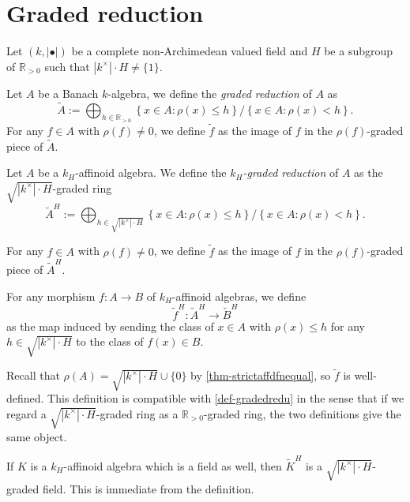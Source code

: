 \section{Graded reduction}
Let $(k,|\bullet|)$ be a complete non-Archimedean valued field and $H$ be a subgroup of $\mathbb{R}_{>0}$ such that $|k^{\times}|\cdot H\neq \{1\}$.

\begin{definition}\label{def-gradedredu}
    Let $A$ be a Banach $k$-algebra, we define the \emph{graded reduction} of $A$ as
    \[
        \tilde{A}:=\bigoplus_{h\in \mathbb{R}_{>0}}  \left\{x\in A:\rho(x)\leq  h\right\}/\left\{x\in A:\rho(x)<  h\right\}.  
    \]
    For any $f\in A$ with $\rho(f)\neq 0$, we define $\tilde{f}$ as the image of $f$ in the $\rho(f)$-graded piece of $\tilde{A}$.
\end{definition}



\begin{definition}
    Let $A$ be a $k_H$-affinoid algebra. We define the \emph{$k_H$-graded reduction} of $A$ as the $\sqrt{|k^{\times}|\cdot H}$-graded ring
    \[
      \tilde{A}^H:=\bigoplus_{h\in \sqrt{|k^{\times}|\cdot H}}\left\{x\in A:\rho(x)\leq  h\right\}/\left\{x\in A:\rho(x)<  h\right\}.  
    \]

    For any $f\in A$ with $\rho(f)\neq 0$, we define $\tilde{f}$ as the image of $f$ in the $\rho(f)$-graded piece of $\tilde{A}^H$.

    For any morphism $f:A\rightarrow B$ of $k_H$-affinoid algebras, we define 
    \[
        \tilde{f}^H:  \tilde{A}^H\rightarrow \tilde{B}^H
    \]
    as the map induced by sending the class of $x\in A$ with $\rho(x)\leq h$ for any $h\in \sqrt{|k^{\times}|\cdot H}$ to the class of $f(x)\in B$.
\end{definition}
Recall that $\rho(A)=\sqrt{|k^{\times}|\cdot H}\cup\{0\}$ by \cref{thm-strictaffdfnequal}, so $\tilde{f}$ is well-defined. This definition is compatible with \cref{def-gradedredu} in the sense that if we regard a  $\sqrt{|k^{\times}|\cdot H}$-graded ring as a $\mathbb{R}_{>0}$-graded ring, the two definitions give the same object.

\begin{example}
    If $K$ is a $k_H$-affinoid algebra which is a field as well, then $\tilde{K}^H$ is a $\sqrt{|k^{\times}|\cdot H}$-graded field. This is immediate from the definition.
\end{example}



